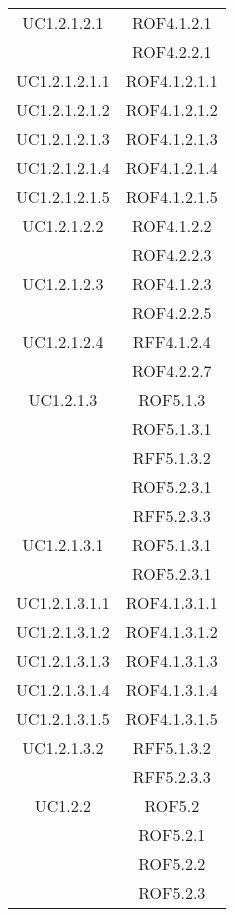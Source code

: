 \begin{longtable}{|c|c|}
\midrule
UC1.2.1.2.1
& ROF4.1.2.1\\
& ROF4.2.2.1\\

\midrule
UC1.2.1.2.1.1
& ROF4.1.2.1.1\\

\midrule
UC1.2.1.2.1.2
& ROF4.1.2.1.2\\

\midrule
UC1.2.1.2.1.3
& ROF4.1.2.1.3\\

\midrule
UC1.2.1.2.1.4
& ROF4.1.2.1.4\\

\midrule
UC1.2.1.2.1.5
& ROF4.1.2.1.5\\

\midrule
UC1.2.1.2.2
& ROF4.1.2.2\\
& ROF4.2.2.3\\

\midrule
UC1.2.1.2.3
& ROF4.1.2.3\\
& ROF4.2.2.5\\

\midrule
UC1.2.1.2.4
& RFF4.1.2.4\\
& ROF4.2.2.7\\

\midrule
UC1.2.1.3
& ROF5.1.3\\
& ROF5.1.3.1\\
& RFF5.1.3.2\\
& ROF5.2.3.1\\
& RFF5.2.3.3\\

\midrule
UC1.2.1.3.1
& ROF5.1.3.1\\
& ROF5.2.3.1\\

\midrule
UC1.2.1.3.1.1
& ROF4.1.3.1.1\\

\midrule
UC1.2.1.3.1.2
& ROF4.1.3.1.2\\

\midrule
UC1.2.1.3.1.3
& ROF4.1.3.1.3\\

\midrule
UC1.2.1.3.1.4
& ROF4.1.3.1.4\\

\midrule
UC1.2.1.3.1.5
& ROF4.1.3.1.5\\

\midrule
UC1.2.1.3.2
& RFF5.1.3.2\\
& RFF5.2.3.3\\

\midrule
UC1.2.2
& ROF5.2\\
& ROF5.2.1\\
& ROF5.2.2\\
& ROF5.2.3\\


\end{longtable}
